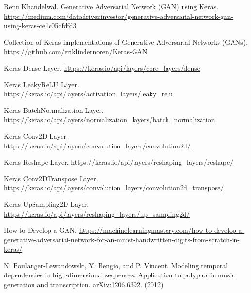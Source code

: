 \begin{thebibliography}{9}
 Renu Khandelwal. Generative Adversarial Network (GAN) using Keras.
\href{https://medium.com/datadriveninvestor/generative-adversarial-network-gan-using-keras-ce1c05cfdfd3}{https://medium.com/datadriveninvestor/generative-adversarial-network-gan-using-keras-ce1c05cfdfd3}

 Collection of Keras implementations of Generative Adversarial Networks (GANs).
\href{https://github.com/eriklindernoren/Keras-GAN}{https://github.com/eriklindernoren/Keras-GAN}

 Keras Dense Layer.
\href{https://keras.io/api/layers/core\_layers/dense}{https://keras.io/api/layers/core\_layers/dense}

 Keras LeakyReLU Layer.
\href{https://keras.io/api/layers/activation\_layers/leaky\_relu}{https://keras.io/api/layers/activation\_layers/leaky\_relu}

 Keras BatchNormalization Layer.
\href{https://keras.io/api/layers/normalization\_layers/batch\_normalization}{https://keras.io/api/layers/normalization\_layers/batch\_normalization}

 Keras Conv2D Layer.
\href{https://keras.io/api/layers/convolution\_layers/convolution2d/}{https://keras.io/api/layers/convolution\_layers/convolution2d/}

 Keras Reshape Layer.
\href{https://keras.io/api/layers/reshaping\_layers/reshape/}{https://keras.io/api/layers/reshaping\_layers/reshape/}

 Keras Conv2DTranspose Layer.
\href{https://keras.io/api/layers/convolution\_layers/convolution2d\_transpose/}{https://keras.io/api/layers/convolution\_layers/convolution2d\_transpose/}

 Keras UpSampling2D Layer.
\href{https://keras.io/api/layers/reshaping\_layers/up\_sampling2d/}{https://keras.io/api/layers/reshaping\_layers/up\_sampling2d/}


 How to Develop a GAN. 
\href{https://machinelearningmastery.com/how-to-develop-a-generative-adversarial-network-for-an-mnist-handwritten-digits-from-scratch-in-keras/}{https://machinelearningmastery.com/how-to-develop-a-generative-adversarial-network-for-an-mnist-handwritten-digits-from-scratch-in-keras/}

 N. Boulanger-Lewandowski, Y. Bengio, and P. Vincent. Modeling temporal dependencies in high-dimensional
sequences: Application to polyphonic music generation and transcription. arXiv:1206.6392. (2012)


\end{thebibliography}
